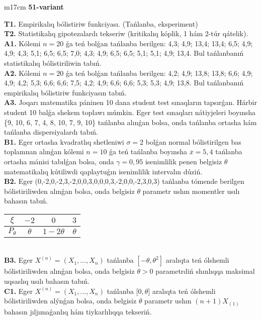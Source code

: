 \documentclass{article}
\begin{document}
\begin{tabular}{m{17cm}}
\textbf{51-variant}
\newline

\textbf{T1.} 
Empirikalıq bólistiriw funkciyası. (Tańlanba, eksperiment)
 \\
\textbf{T2.} 
Statistikalıq gipotezalardı tekseriw (kritikalıq kóplik, 1 hám 2-túr qátelik).
 \\
\textbf{A1.} 
Kólemi \(n = 20\) ǵa teń bolǵan tańlanba berilgen: 4,3; 4,9; 13,4; 13,4; 6,5; 4,9; 4,9; 4,3; 5,1; 6,5; 6,5; 7,0; 4,3; 4,9; 6,5; 6,5; 5,1; 5,1; 4,9; 13,4. Bul tańlanbanıń statistikalıq bólistiriliwin tabıń.
 \\
\textbf{A2.} 
Kólemi \(n = 20\) ǵa teń bolǵan tańlanba berilgen: 4,2; 4,9; 13,8; 13,8; 6,6; 4,9; 4,9; 4,2; 5,3; 6,6; 6,6; 7,5; 4,2; 4,9; 6,6; 6,6; 5,3; 5,3; 4,9; 13,8. Bul tańlanbanıń empirikalıq bólistiriw funkciyasın tabıń.
 \\
\textbf{A3.} 
Joqarı matematika páninen 10 dana student test sınaqların tapsırǵan. Hárbir student 10 balǵa shekem toplawı múmkin. Eger test sınaqları nátiyjeleri boyınsha \{9, 10, 6, 7, 4, 8, 10, 7, 9, 10\} tańlanba alınǵan bolsa, onda tańlanba ortasha hám tańlanba dispersiyalardı tabıń.
 \\
\textbf{B1.} 
Eger ortasha kvadratlıq shetleniwi \(\sigma = 2\) bolǵan normal bólistirilgen bas toplamnan alınǵan kólemi \(n = 10\) ǵa teń tańlanba boyınsha \(\overline{x} = 5,4\) tańlanba ortasha mánisi tabılǵan bolsa, onda \(\gamma = 0,95\) isenimlilik penen belgisiz \(\theta\) matematikalıq kútiliwdi qaplaytuǵın isenimlilik intervalın dúziń.
 \\
\textbf{B2.} 
Eger (0,-2,0,-2,3,-2,0,0,3,0,0,0,3,-2,0,0,-2,3,0,3) tańlanba tómende berilgen bólistiriliwden alınǵan bolsa, onda belgisiz \(\theta\) parametr ushın momentler usılı bahasın tabıń.
\begin{tabular}{|c|c|c|c|}
  \hline
$\xi$ & $- 2$  & $0$  & $3$ \\
\hline
\(P_{\theta}\) & \(\theta\) & \(1 - 2\theta\) & \(\theta\) \\
\hline
\end{tabular}
 \\
\textbf{B3.} 
Eger \(X^{(n)} = \left( X_{1},...,X_{n} \right)\) tańlanba \(\left\lbrack - \theta,\theta^{2} \right\rbrack\) aralıqta teń ólshemli bólistiriliwden alınǵan bolsa, onda belgisiz \(\theta > 0\) parametrdiń shınlıqqa maksimal uqsaslıq usılı bahasın tabıń.
 \\
\textbf{C1.} 
Eger \(X^{(n)} = \left( X_{1},...,X_{n} \right)\) tańlanba \(\lbrack 0,\theta\rbrack\) aralıqta teń ólshemli bólistiriliwden alýnǵan bolsa, onda belgisiz \(\theta\) parametr ushın \((n + 1)X_{(1)}\) bahasın jıljımaǵanlıq hám tiykarlılıqqa tekseriń.

\end{tabular}
\end{document}
